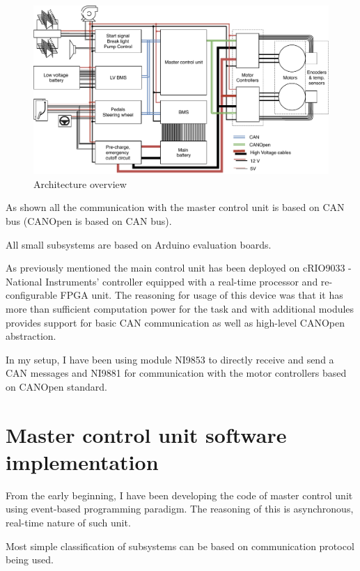 \begin{figure}[h]
    \centering
    \includegraphics[width=\textwidth]{figures/Whole_with_details.pdf}
    \caption{Architecture overview}
    \label{fig:whole}
\end{figure}

As shown all the communication with the master control unit is based on CAN bus (CANOpen is based on CAN bus). 






All small subsystems are based on Arduino evaluation boards.




As previously mentioned the main control unit has been deployed on cRIO9033 - National Instruments' controller equipped with a real-time processor and re-configurable FPGA unit. The reasoning for usage of this device was that it has more than sufficient computation power for the task and with additional modules provides support for basic CAN communication as well as high-level CANOpen abstraction.


In my setup, I have been using module NI9853 to directly receive and send a CAN messages and NI9881 for communication with the motor controllers based on CANOpen standard.

\section{Master control unit software implementation}
From the early beginning, I have been developing the code of master control unit using event-based programming paradigm. The reasoning of this is asynchronous, real-time nature of such unit.

Most simple classification of subsystems can be based on communication protocol being used. 

